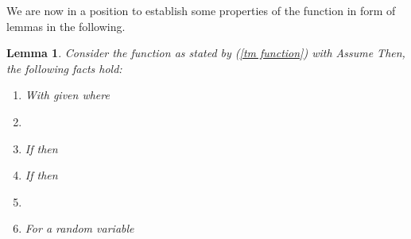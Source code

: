 \documentclass[journal]{IEEEtran}
\newtheorem{lemma}{Lemma}
\begin{document}
We are now in a position to establish some properties of the function  in form of lemmas in the following.
\begin{lemma}\label{m lemma}
Consider the function  as stated by (\ref{tm function}) with  Assume  Then, the following facts hold:
\begin{enumerate}
\item With given  
    where \label{fact 1}
\item  \label{fact 2}
\item If  then  \label{fact 3}
\item If  then \label{fact 5}
\item \label{fact 6}
\item For a random variable  \label{fact 7}
\end{enumerate}
\end{lemma}
\end{document}
